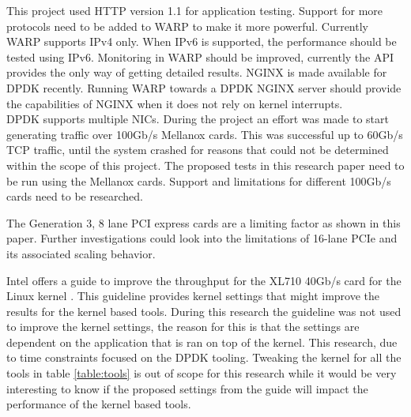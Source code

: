 This project used HTTP version 1.1 for application testing. Support for more protocols need to be added to WARP to make it more powerful. 
Currently WARP supports IPv4 only. When IPv6 is supported, the performance should be tested using IPv6. 
Monitoring in WARP should be improved, currently the API provides the only way of getting detailed results.
NGINX is made available for DPDK recently. Running WARP towards a DPDK NGINX server should provide the capabilities of NGINX when it does not rely on kernel interrupts. \\

DPDK supports multiple NICs. During the project an effort was made to start generating traffic over 100Gb/s Mellanox cards.
This was successful up to 60Gb/s TCP traffic, until the system crashed for reasons that could not be determined within the scope of this project. 
The proposed tests in this research paper need to be run using the Mellanox cards. 
Support and limitations for different 100Gb/s cards need to be researched.

The Generation 3, 8 lane PCI express cards are a limiting factor as shown in this paper. 
Further investigations could look into the limitations of 16-lane PCIe and its associated scaling behavior.

Intel offers a guide to improve the throughput for the XL710 40Gb/s card for the Linux kernel \cite{intellinuxguidxl710}. 
This guideline provides kernel settings that might improve the results for the kernel based tools.
During this research the guideline was not used to improve the kernel settings, the reason for this is that the settings are dependent on the application that is ran on top of the kernel. 
This research, due to time constraints focused on the DPDK tooling. Tweaking the kernel for all the tools in table \ref{table:tools} is out of scope for this research while it would be very interesting to know if the proposed settings from the guide will impact the performance of the kernel based tools. 

